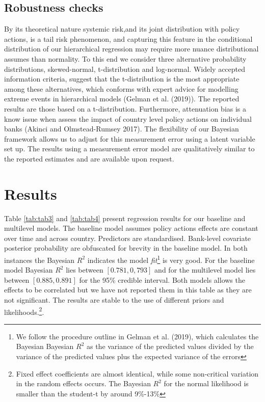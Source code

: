\documentclass[
  10pt,
]{article}
\begin{document}
\hypertarget{robustness-checks}{%
\subsection{Robustness checks}\label{robustness-checks}}

By its theoretical nature systemic risk,and its joint distribution with
policy actions, is a tail risk phenomenon, and capturing this feature in
the conditional distribution of our hierarchical regression may require
more nuance distributional assumes than normality. To this end we
consider three alternative probability distributions, skewed-normal,
t-distribution and log-normal. Widely accepted information criteria,
suggest that the t-distribution is the most appropriate among these
alternatives, which conforms with expert advice for modelling extreme
events in hierarchical models (Gelman et al. (2019)). The reported
results are those based on a t-distribution. Furthermore, attenuation
bias is a know issue when assess the impact of country level policy
actions on individual banks (Akinci and Olmstead-Rumsey 2017). The
flexibility of our Bayesian framework allows us to adjust for this
measurement error using a latent variable set up. The results using a
measurement error model are qualitatively similar to the reported
estimates and are available upon request.

\hypertarget{results}{%
\section{Results}\label{results}}

Table \ref{tab:tab3} and \ref{tab:tab4} present regression results for
our baseline and multilevel models. The baseline model assumes policy
actions effects are constant over time and across country. Predictors
are standardised. Bank-level covariate posterior probability are
obfuscated for brevity in the baseline model. In both instances the
Bayesian \(R^2\) indicates the model \emph{fit}\footnote{We follow the
  procedure outline in Gelman et al. (2019), which calculates the
  Bayesian Bayesian \(R^2\) as the variance of the predicted values
  divided by the variance of the predicted values plus the expected
  variance of the errors} is very good. For the baseline model Bayesian
\(R^2\) lies between \([0.781,0,793]\) and for the multilevel model lies
between \([0.885,0.891]\) for the 95\% credible interval. Both models
allows the effects to be correlated but we have not reported them in
this table as they are not significant. The results are stable to the
use of different priors and likelihoods.\footnote{Fixed effect
  coefficients are almost identical, while some non-critical variation
  in the random effects occurs. The Bayesian \(R^2\) for the normal
  likelihood is smaller than the student-t by around 9\%-13\%}.
\end{document}
